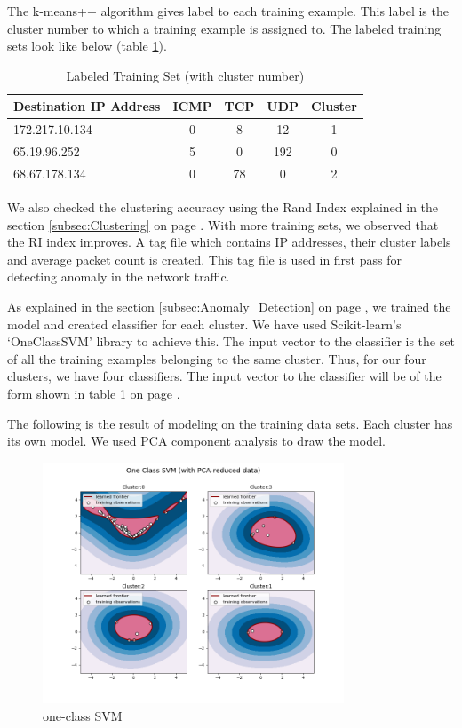 \documentclass[12pt,oneside,a4paper]{article}
\begin{document}
The k-means++ algorithm gives label to each training example. This label is the cluster number to which a training example is assigned to. The labeled training sets look like below (table \ref{table:labeled-set}).

\begin{table}[H]
\centering
  \begin{tabular}{| l | c | c | c | c |}
    \hline
    {Destination IP Address}  &ICMP  &TCP &UDP  &Cluster \\
    \hline
    172.217.10.134  & 0     & 8     & 12  &1  \\ \hline
    65.19.96.252    & 5     & 0     & 192 &0  \\ \hline
    68.67.178.134   & 0     & 78    & 0   &2  \\ \hline
  \end{tabular}
\caption{Labeled Training Set (with cluster number)} \label{table:labeled-set}
\end{table}

We also checked the clustering accuracy using the Rand Index explained in the section \ref{subsec:Clustering} on page \pageref{subsec:Clustering}. With more training sets, we observed that the RI index improves. A tag file which contains IP addresses, their cluster labels and average packet count is created. This tag file is used in first pass for detecting anomaly in the network traffic.

As explained in the section \ref{subsec:Anomaly_Detection} on page \pageref{subsec:Anomaly_Detection}, we trained the model and created classifier for each cluster. We have used Scikit-learn's `OneClassSVM' library to achieve this. The input vector to the classifier is the set of all the training examples belonging to the same cluster. Thus, for our four clusters, we have four classifiers. The input vector to the classifier will be of the form shown in table \ref{table:labeled-set} on page \pageref{table:labeled-set}.

The following is the result of modeling on the training data sets. Each cluster has its own model. We used PCA component analysis to draw the model.

\begin{figure}[H]
\centering
\includegraphics[width=0.80\textwidth]{one-class-SVM.png}
\caption{one-class SVM} \label{fig:one-class-SVM}
\end{figure}
\end{document}
